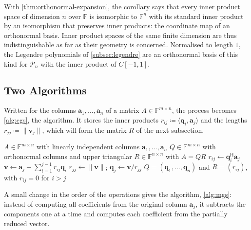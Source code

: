 With \cref{thm:orthonormal-expansion}, the corollary says that every inner product space of dimension $n$ over $\mathbb F$ is isomorphic to $\mathbb F^n$ with its standard inner product by an isomorphism that preserves inner products: the coordinate map of an orthonormal basis. Inner product spaces of the same finite dimension are thus indistinguishable as far as their geometry is concerned. Normalised to length $1$, the Legendre polynomials of \cref{subsec:legendre} are an orthonormal basis of this kind for $\mathcal P_n$ with the inner product of $C[-1,1]$.

\subsection{Two Algorithms}

Written for the columns $\mathbf a_1,\ldots,\mathbf a_n$ of a matrix $A\in\mathbb F^{m\times n}$, the process becomes \cref{alg:cgs}, the  algorithm. It stores the inner products $r_{ij}\coloneqq\langle\mathbf q_i,\mathbf a_j\rangle$ and the lengths $r_{jj}\coloneqq\|\mathbf v_j\|$, which will form the matrix $R$ of the next subsection.

\begin{algorithm}
\begin{algorithmic}[1]
\Require $A\in\mathbb F^{m\times n}$ with linearly independent columns $\mathbf a_1,\ldots,\mathbf a_n$
\Ensure $Q\in\mathbb F^{m\times n}$ with orthonormal columns and upper triangular $R\in\mathbb F^{n\times n}$ with $A=QR$
    \State $r_{ij}\gets\mathbf q_i^{\mathsf H}\mathbf a_j$ 
  \EndFor
  \State $\mathbf v\gets\mathbf a_j-\sum_{i=1}^{j-1}r_{ij}\mathbf q_i$
  \State $r_{jj}\gets\|\mathbf v\|$; $\mathbf q_j\gets\mathbf v/r_{jj}$
\EndFor
\State \Return $Q=(\mathbf q_1,\ldots,\mathbf q_n)$ and $R=(r_{ij})$, with $r_{ij}=0$ for $i>j$
\end{algorithmic}
\caption{The classical Gram--Schmidt algorithm (\cref{thm:gram-schmidt}). Column $j$ costs about $4m(j-1)$ operations, the whole algorithm about $2mn^2$.}
\label{alg:cgs}
\end{algorithm}

A small change in the order of the operations gives the  algorithm, \cref{alg:mgs}: instead of computing all coefficients from the original column $\mathbf a_j$, it subtracts the components one at a time and computes each coefficient from the partially reduced vector.

